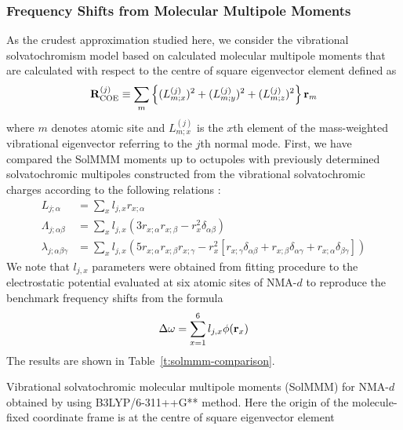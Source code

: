 \documentclass[a4paper,titlepage,twoside,fleqn,12pt]{book}
\begin{document}
\begin{refsection}
\subsubsection{Frequency Shifts from Molecular Multipole Moments}

As the crudest approximation studied here, we consider 
the vibrational solvatochromism model based on calculated
molecular multipole moments that are calculated with respect to
the centre of square eigenvector element
defined as
%
\begin{equation} \label{e:coe}
 {\bf R}_{\rm COE}^{(j)} \equiv 
 \sum_m \left\{ (L^{(j)}_{m;x})^2 + (L^{(j)}_{m;y})^2 + (L^{(j)}_{m;z})^2\right\} {\bf r}_m
\end{equation}
%
where $m$ denotes atomic site and $L^{(j)}_{m;x}$ is the $x$th
element of the mass\hyp{}weighted vibrational eigenvector
referring to the $j$th normal mode.
First, we have compared the SolMMM moments up to octupoles
with previously determined solvatochromic multipoles
constructed from the vibrational solvatochromic charges
according to the following relations \citep{Lee.Choi.Cho.JCP.2012}:
%
\begin{subequations}
\begin{align}
 L_{j;\alpha}                  &= \sum_x l_{j,x} r_{x;\alpha} \\
 \Lambda_{j;\alpha\beta}       &= \sum_x l_{j,x} \left( 3r_{x;\alpha}r_{x;\beta} - r_x^2 \delta_{\alpha\beta}\right) \\
 \lambda_{j;\alpha\beta\gamma} &= \sum_x l_{j,x}\left( 5r_{x;\alpha}r_{x;\beta}r_{x;\gamma} - r_x^2 \left[
                    r_{x;\gamma}\delta_{\alpha\beta} + r_{x;\beta}\delta_{\alpha\gamma} + r_{x;\alpha}\delta_{\beta\gamma}\right]\right)
\end{align}
\end{subequations}
%
We note that $l_{j,x}$ parameters were obtained from fitting procedure
to the electrostatic potential evaluated
at six atomic sites of NMA-$d$ to reproduce the benchmark frequency shifts 
from the formula
%
\begin{equation}
 \Delta\omega = \sum_{x=1}^6 l_{j,x} \phi({\bf r}_x)
\end{equation}
%
The results are shown in Table~\ref{t:solmmm-comparison}.
%
\begin{table}[t]
\caption{
Vibrational solvatochromic molecular multipole moments (SolMMM) 
for NMA-$d$ obtained by using 
B3LYP/6-311++G** method. Here the origin
of the molecule\hyp{}fixed coordinate frame is at the centre of 
square eigenvector element
}
\end{table}
\end{refsection}
\end{document}
